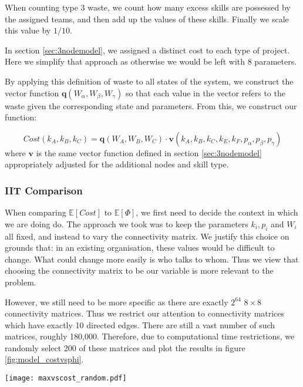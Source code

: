 When counting type 3 waste, we count how many excess skills are possessed by the assigned teams, and then add up the values of these skills. Finally we scale this value by $1/10$.

\begin{remark}
	In section \ref{sec:3nodemodel}, we assigned a distinct cost to each type of project. Here we simplify that approach as otherwise we would be left with 8 parameters.
\end{remark}

By applying this definition of waste to all states of the system, we construct the vector function $\mathbf{q}(W_\alpha, W_\beta, W_\gamma)$ so that each value in the vector refers to the waste given the corresponding state and parameters. From this, we construct our function:

\begin{equation}
\label{eq:cost_function}
Cost(k_A, k_B, k_C) = \mathbf{q}(W_A, W_B, W_C) \cdot \mathbf{v}(k_A, k_B, k_C,k_E, k_F, p_\alpha, p_\beta, p_\gamma)
\end{equation}
where $\mathbf{v}$ is the same vector function defined in section \ref{sec:3nodemodel} appropriately adjusted for the additional nodes and skill type.

\subsubsection{IIT Comparison}

When comparing $\mathbb{E}[Cost]$ to $\mathbb{E}[\Phi]$, we first need to decide the context in which we are doing do. The approach we took was to keep the parameters $k_i, p_i$ and $W_i$ all fixed, and instead to vary the connectivity matrix. We justify this choice on grounds that: in an existing organisation, these values would be difficult to change. What could change more easily is who talks to whom. Thus we view that choosing the connectivity matrix to be our variable is more relevant to the problem.

However, we still need to be more specific as there are exactly $2^{64}$ $8\times 8$ connectivity matrices. Thus we restrict our attention to connectivity matrices which have exactly 10 directed edges. There are still a vast number of such matrices, roughly 180,000. Therefore, due to computational time restrictions, we randomly select 200 of these matrices and plot the results in figure \ref{fig:model_costvsphi}.

\begin{SCfigure}
	\centering
	\texttt{[image: maxvscost\_random.pdf]}
	\caption{We plot $\mathbb{E}[Cost]$ against $\mathbb{E}[\Phi]$ for 200 randomly selected connectivity matrices with precisely 10 directed edges.}
	\label{fig:model_costvsphi}
\end{SCfigure}


